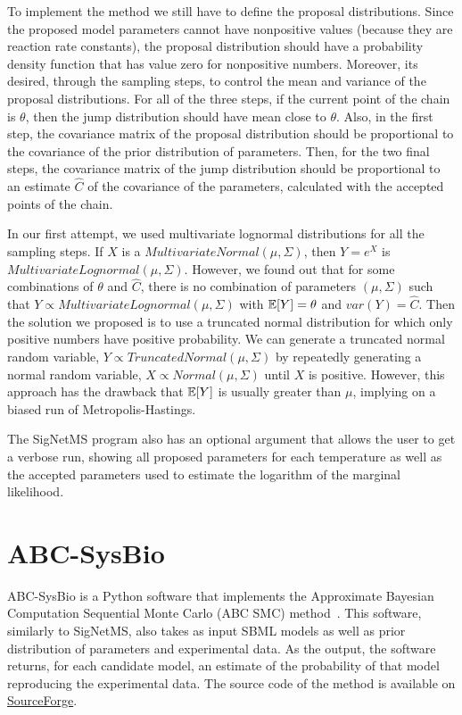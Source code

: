 To implement the method we still have to define the proposal 
distributions. Since the proposed model parameters cannot have 
nonpositive values (because they are reaction rate constants), the 
proposal distribution should have a probability density function that 
has value zero for nonpositive numbers. Moreover, its desired, through 
the sampling steps, to control the mean and variance of the proposal 
distributions. For all of the three steps, if the current point of the
chain is $\theta$, then the jump distribution should have mean close
to $\theta$. Also, in the first step, the covariance matrix  of the 
proposal distribution should be proportional to the covariance of 
the prior distribution of parameters. Then, for the two final steps, the 
covariance matrix of the jump distribution should be proportional to an
estimate $\hat{C}$ of the covariance of the parameters, calculated with 
the accepted points of the chain.

In our first attempt, we used multivariate lognormal distributions for 
all the sampling steps. If $X$ is a $MultivariateNormal (\mu, \Sigma)$, 
then $Y = e^{X}$ is $MultivariateLognormal (\mu, \Sigma)$. However, we 
found out that for some combinations of $\theta$ and $\hat{C}$, there 
is no combination of parameters $(\mu, \Sigma)$ such that $Y \propto 
MultivariateLognormal (\mu, \Sigma)$ with $\mathbb{E}[Y] = \theta$ and
$var(Y) = \hat{C}$. Then the solution we proposed is to use a truncated 
normal distribution for which only positive numbers have positive 
probability. We can generate a truncated normal random variable, 
$Y \propto TruncatedNormal (\mu, \Sigma)$ by 
repeatedly generating a normal random variable, $X \propto Normal(\mu, 
\Sigma)$ until $X$ is positive. However, this approach has the drawback 
that  $\mathbb{E}[Y]$ is usually greater than $\mu$, implying on a 
biased run of Metropolis-Hastings.

The SigNetMS program also has an optional argument that allows the user
to get a verbose run, showing all proposed parameters for each 
temperature as well as the accepted parameters used to estimate the 
logarithm of the marginal likelihood. 

\section{ABC-SysBio}
ABC-SysBio is a Python software that implements the Approximate Bayesian
Computation Sequential Monte Carlo (ABC SMC) method~\cite{Liepe2010}. 
This software, similarly to SigNetMS, also takes as input SBML models as 
well as prior distribution of parameters and experimental data. As the 
output, the software returns, for each candidate model, an estimate of 
the probability of that model reproducing the experimental data. The 
source code of the method is available on 
\href{https://sourceforge.net/projects/abc-sysbio/files/}{SourceForge}.

